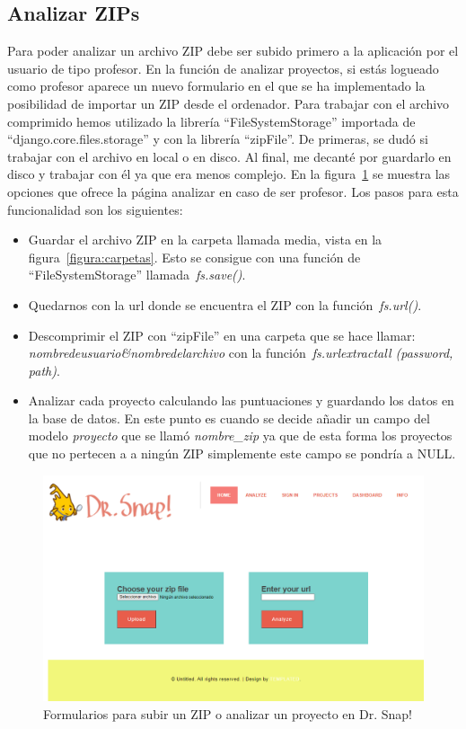 \documentclass[a4paper, 12pt]{book}
\begin{document}
\subsection{Analizar ZIPs}
Para poder analizar un archivo ZIP debe ser subido primero a la aplicación por el usuario de tipo profesor. En la función de analizar proyectos, si estás logueado como profesor aparece un nuevo formulario en el que se ha implementado la posibilidad de importar un ZIP desde el ordenador. Para trabajar con el archivo comprimido hemos utilizado la librería ``FileSystemStorage'' importada de ``django.core.files.storage'' y con la librería ``zipFile''. De primeras, se dudó si trabajar con el archivo en local o en disco. Al final, me decanté por guardarlo en disco y trabajar con él ya que era menos complejo. En la figura~\ref{figura:zip} se muestra las opciones que ofrece la página analizar en caso de ser profesor. Los pasos para esta funcionalidad son los siguientes:
\begin{itemize}
    \item Guardar el archivo ZIP  en la carpeta llamada media, vista en la figura~\ref{figura:carpetas}. Esto se consigue con una función de ``FileSystemStorage'' llamada~\textit{fs.save()}.
    \item Quedarnos con la url donde se encuentra el ZIP con la función~\textit{fs.url()}.
    \item Descomprimir el ZIP con ``zipFile'' en una carpeta que se hace llamar: \textit{nombredeusuario\&nombredelarchivo } con la función~\textit{fs.urlextractall (password, path)}.
    \item Analizar cada proyecto calculando las puntuaciones y guardando los datos en la base de datos. En este punto es cuando se decide añadir un campo del modelo \textit{proyecto} que se llamó \textit{nombre\_zip} ya que de esta forma los proyectos que no pertecen a a ningún ZIP simplemente  este campo se pondría a NULL.
\end{itemize}
\begin{figure}[h]
\centering
            \includegraphics[scale=0.5]{img/zip.PNG}
            \caption{Formularios para subir un ZIP o analizar un proyecto en Dr. Snap!}
            \label{figura:zip}
    \end{figure}
\end{document}
